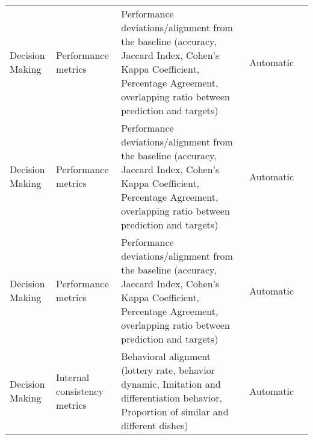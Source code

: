 \begin{small}
\begin{center}
\begin{longtable}{@{}p{}p{}p{}p{}p{}@{}}
Decision Making          & Performance metrics                 & Performance deviations/alignment from the baseline (accuracy, Jaccard Index, Cohen’s Kappa Coefficient, Percentage Agreement, overlapping ratio between prediction and targets)                             & Automatic & \cite{Jin2024AgentReviewEP}                                                                                                                                                                                                                                                                                                                                                                                     \\
Decision Making          & Performance metrics                 & Performance deviations/alignment from the baseline (accuracy, Jaccard Index, Cohen’s Kappa Coefficient, Percentage Agreement, overlapping ratio between prediction and targets)                             & Automatic & \cite{Wang2024DEEMDE}                                                                                                                                                                                                                                                                                                                                                                                     \\
Decision Making          & Performance metrics                 & Performance deviations/alignment from the baseline (accuracy, Jaccard Index, Cohen’s Kappa Coefficient, Percentage Agreement, overlapping ratio between prediction and targets)                             & Automatic & \cite{wang-etal-2024-unleashing}                                                                                                                                                                                                                                                                                                                                                                                             \\
Decision Making          & Internal consistency metrics        & Behavioral alignment (lottery rate, behavior dynamic, Imitation and differentiation behavior, Proportion of similar and different dishes)                                                                   & Automatic & \cite{Xie2024CanLL}                                                                                                                                                                                                                                                                                                                                                                                               \\

\end{longtable}
\end{center}
\end{small}
